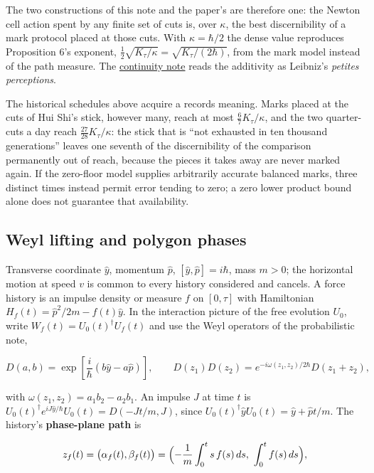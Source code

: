 \documentclass[11pt,a4paper]{article}
\begin{document}
The two constructions of this note and the paper's are therefore one:
the Newton cell action spent by any finite set of cuts is, over
\(\kappa\), the best discernibility of a mark protocol placed at those
cuts. With \(\kappa=\hbar/2\) the dense value reproduces Proposition 6's
exponent, \(\frac12\sqrt{K_\tau/\kappa}=\sqrt{K_\tau/(2\hbar)}\), from
the mark model instead of the path measure. The
\href{leibniz-continuity-records.md}{continuity note} reads the
additivity as Leibniz's \emph{petites perceptions}.

The historical schedules above acquire a records meaning. Marks placed
at the cuts of Hui Shi's stick, however many, reach at most
\(\frac67K_\tau/\kappa\), and the two quarter-cuts a day reach
\(\frac{27}{28}K_\tau/\kappa\): the stick that is ``not exhausted in ten
thousand generations'' leaves one seventh of the discernibility of the
comparison permanently out of reach, because the pieces it takes away
are never marked again. If the zero-floor model supplies arbitrarily
accurate balanced marks, three distinct times instead permit error
tending to zero; a zero lower product bound alone does not guarantee
that availability.

\hypertarget{weyl-lifting-and-polygon-phases}{%
\subsection{Weyl lifting and polygon
phases}\label{weyl-lifting-and-polygon-phases}}

Transverse coordinate \(\hat y\), momentum \(\hat p\),
\([\hat y,\hat p]=i\hbar\), mass \(m>0\); the horizontal motion at speed
\(v\) is common to every history considered and cancels. A force history
is an impulse density or measure \(f\) on \([0,\tau]\) with Hamiltonian
\(H_f(t)=\hat p^2/2m-f(t)\hat y\). In the interaction picture of the
free evolution \(U_0\), write \(W_f(t)=U_0(t)^\dagger U_f(t)\) and use
the Weyl operators of the probabilistic note,

\[D(a,b)=\exp\!\left[\frac{i}{\hbar}(b\hat y-a\hat p)\right],\qquad
D(z_1)D(z_2)=e^{-i\omega(z_1,z_2)/2\hbar}D(z_1+z_2),\]

with \(\omega(z_1,z_2)=a_1b_2-a_2b_1\). An impulse \(J\) at time \(t\)
is \(U_0(t)^\dagger e^{iJ\hat y/\hbar}U_0(t)=D(-Jt/m,J)\), since
\(U_0(t)^\dagger\hat yU_0(t)=\hat y+\hat pt/m\). The history's
\textbf{phase-plane path} is

\[z_f(t)=\bigl(\alpha_f(t),\beta_f(t)\bigr)
=\Bigl(-\frac1m\int_0^ts\,f(s)\,ds,\ \int_0^tf(s)\,ds\Bigr),\]
\end{document}
